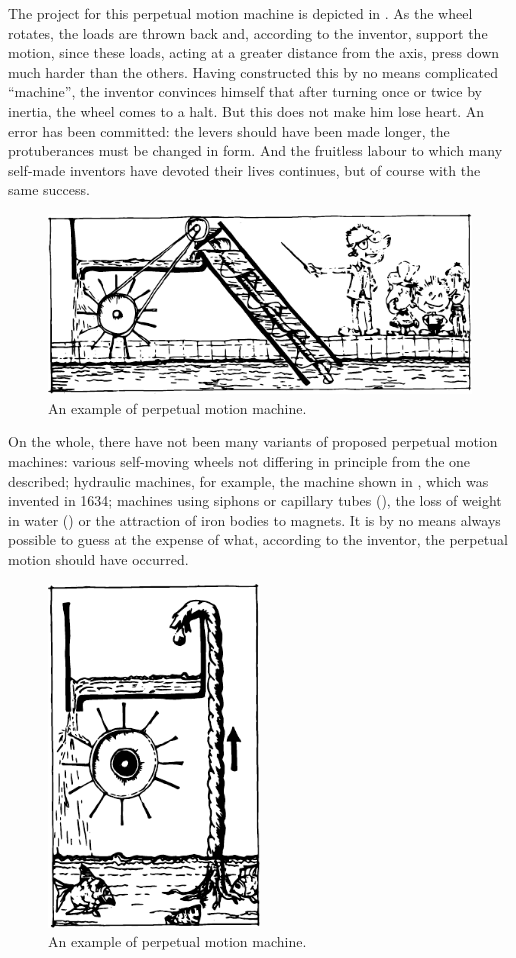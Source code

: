 The project for this perpetual motion machine is depicted in . As the wheel rotates, the loads are
thrown back and, according to the inventor, support the
motion, since these loads, acting at a greater distance from the axis, press down much harder than the others. Having constructed this by no means complicated ``machine'', the inventor convinces himself that after turning once or twice by inertia, the wheel comes to a halt. But this does not make him lose heart. An error has been committed: the levers should have been made longer, the protuberances must be changed in form. And the fruitless labour to which many self-made inventors have devoted their lives continues, but of course with the same success.
\begin{figure}[!ht]
\centering
\includegraphics[width=\textwidth]{figures/fig-03-08.pdf}
\caption{An example of perpetual motion machine.}
\label{fig-3.08}
\end{figure}
On the whole, there have not been many variants of
proposed perpetual motion machines: various self-moving
wheels not differing in principle from the one described;
hydraulic machines, for example, the machine shown in
, which was invented in 1634; machines using
siphons or capillary tubes (), the loss of weight
in water () or the attraction of iron bodies to
magnets. It is by no means always possible to guess at
the expense of what, according to the inventor, the perpetual motion should have occurred.
\begin{figure}[!ht]
\centering
\includegraphics[width=0.5\textwidth]{figures/fig-03-09.pdf}
\caption{An example of perpetual motion machine.}
\label{fig-3.09}
\end{figure}
